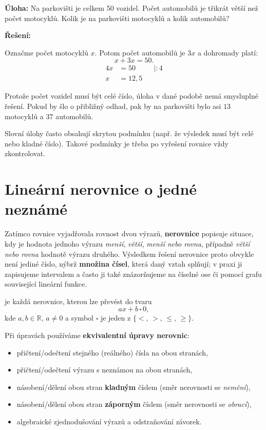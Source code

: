 \documentclass[12pt,a4paper]{article}
\begin{document}
\begin{examplebox}
\textbf{Úloha:}  
Na parkovišti je celkem 50 vozidel.  
Počet automobilů je třikrát větší než počet motocyklů.  
Kolik je na parkovišti motocyklů a kolik automobilů?

\medskip
\textbf{Řešení:}

Označme počet motocyklů $x$.  
Potom počet automobilů je $3x$ a dohromady platí:
\[
x + 3x = 50.
\]
\begin{align*}
4x &= 50 &&| :4\\
x &= 12{,}5
\end{align*}

Protože počet vozidel musí být celé číslo, úloha v dané podobě nemá smysluplné řešení.  
Pokud by šlo o přibližný odhad, pak by na parkovišti bylo asi $13$ motocyklů a $37$ automobilů.

\begin{notebox}
Slovní úlohy často obsahují skrytou podmínku (např. že výsledek musí být celé nebo kladné číslo).  
Takové podmínky je třeba po vyřešení rovnice vždy zkontrolovat.
\end{notebox}
\end{examplebox}





\newpage
\section{Lineární nerovnice o jedné neznámé}


Zatímco rovnice vyjadřovala rovnost dvou výrazů, \textbf{nerovnice} popisuje situace, kdy je hodnota jednoho výrazu \emph{menší}, \emph{větší}, \emph{menší nebo rovna}, případně \emph{větší nebo rovna} hodnotě výrazu druhého.  
Výsledkem řešení nerovnice proto obvykle není jediné číslo, nýbrž \textbf{množina čísel}, která daný vztah splňují; v praxi ji zapisujeme intervalem a často ji také znázorňujeme na číselné ose či pomocí grafu související lineární funkce.

\begin{definitionbox}
 je každá nerovnice, kterou lze převést do tvaru
\[
ax + b \,\square\, 0,
\]
kde $a,b\in\mathbb{R}$, $a\neq 0$ a symbol $\square$ je jeden z $\{<,\,>,\,\le,\,\ge\}$.

Při úpravách používáme \textbf{ekvivalentní úpravy nerovnic}:
\begin{itemize}
  \item přičtení/odečtení stejného (reálného) čísla na obou stranách,
  \item přičtení/odečtení výrazu s neznámou na obou stranách,
  \item násobení/dělení obou stran \textbf{kladným} číslem (směr nerovnosti se \emph{nemění}),
  \item násobení/dělení obou stran \textbf{záporným} číslem (směr nerovnosti se \emph{obrací}),
  \item algebraické zjednodušování výrazů a odstraňování závorek.
\end{itemize}
\end{definitionbox}
\end{document}
